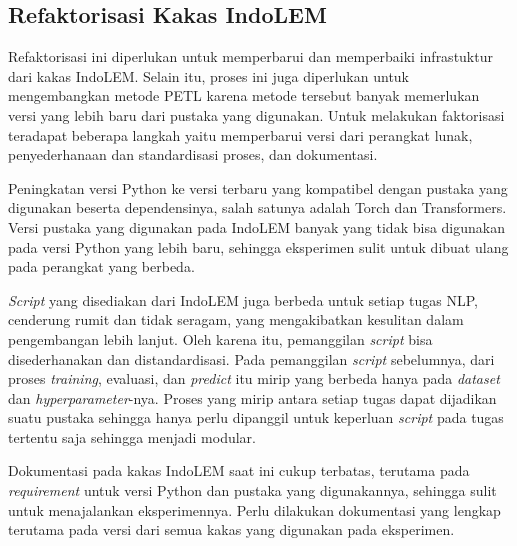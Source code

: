 \subsection{Refaktorisasi Kakas IndoLEM}

Refaktorisasi ini diperlukan untuk memperbarui dan memperbaiki infrastuktur dari kakas IndoLEM. Selain itu, proses ini juga diperlukan untuk mengembangkan metode PETL karena metode tersebut banyak memerlukan versi yang lebih baru dari pustaka yang digunakan. Untuk melakukan faktorisasi teradapat beberapa langkah yaitu memperbarui versi dari perangkat lunak, penyederhanaan dan standardisasi proses, dan dokumentasi.

Peningkatan versi Python ke versi terbaru yang kompatibel dengan pustaka yang digunakan beserta dependensinya, salah satunya adalah Torch dan Transformers. Versi pustaka yang digunakan pada IndoLEM banyak yang tidak bisa digunakan pada versi Python yang lebih baru, sehingga eksperimen sulit untuk dibuat ulang pada perangkat yang berbeda. 

\textit{Script} yang disediakan dari IndoLEM juga berbeda untuk setiap tugas NLP, cenderung rumit dan tidak seragam, yang mengakibatkan kesulitan dalam pengembangan lebih lanjut. Oleh karena itu, pemanggilan \textit{script} bisa disederhanakan dan distandardisasi. Pada pemanggilan \textit{script} sebelumnya, dari proses \textit{training}, evaluasi, dan \textit{predict} itu mirip yang berbeda hanya pada \textit{dataset} dan \textit{hyperparameter}-nya. Proses yang mirip antara setiap tugas dapat dijadikan suatu pustaka sehingga hanya perlu dipanggil untuk keperluan \textit{script} pada tugas tertentu saja sehingga menjadi modular.

Dokumentasi pada kakas IndoLEM saat ini cukup terbatas, terutama pada \textit{requirement} untuk versi Python dan pustaka yang digunakannya, sehingga sulit untuk menajalankan eksperimennya. Perlu dilakukan dokumentasi yang lengkap terutama pada versi dari semua kakas yang digunakan pada eksperimen.